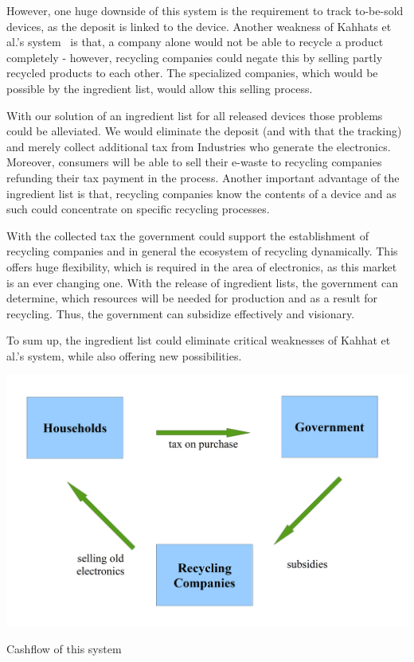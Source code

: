 However, one huge downside of this system is the requirement to track to-be-sold devices, 
as the deposit is linked to the device. 
Another weakness of Kahhats et al.'s system~\cite{kahhat2008exploring} is that, a company alone would not 
be able to recycle a product completely - however, recycling companies could negate this 
by selling partly recycled products to each other. The specialized companies, which would 
be possible by the ingredient list, would allow this selling process.

With our solution of an ingredient list for all released devices those problems could be alleviated. We would eliminate the deposit 
(and with that the tracking) and merely collect additional tax from Industries who generate the electronics. 
Moreover, consumers will be able to sell their e-waste to recycling companies refunding their tax payment in the process. 
Another important advantage of the ingredient list is that, recycling companies know the 
contents of a device and as such could concentrate on specific recycling processes. 

With the collected tax the government could support the establishment of recycling companies 
and in general the ecosystem of recycling dynamically. This offers huge flexibility, which 
is required in the area of electronics, as this market is an ever changing one. With the 
release of ingredient lists, the government can determine, which resources will be needed 
for production and as a result for recycling. Thus, the government can subsidize effectively and visionary.

To sum up, the ingredient list could eliminate critical weaknesses of Kahhat et al.'s system, 
while also offering new possibilities.

\begin{center}
\begin{table}[!htbp]
\includegraphics[width=0.5\columnwidth]{figure/cashflow.png}
\label{table:2}
\caption{Cashflow of this system}
\end{table}
\end{center}


\label{applications}